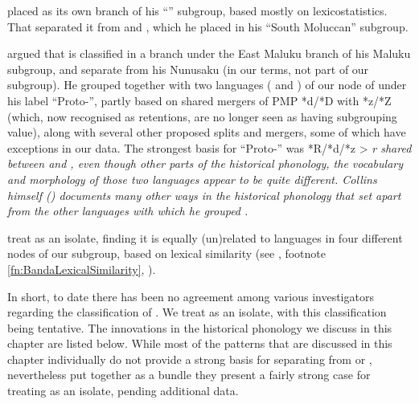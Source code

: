 \citet{Chlenov1976} placed  as its own branch of his “”
subgroup, based mostly on lexicostatistics.
That separated it from 
and , which he placed in his “South Moluccan” subgroup.

\citet{Collins1986} argued that  is classified in a branch
under the East  Maluku branch of his  Maluku subgroup,
and separate from his Nunusaku (in our terms,
not part of our  subgroup).
He grouped  together with two languages (
and ) of our  node of 
under his label “Proto-”,
partly based on shared mergers of PMP *d/*D with *z/*Z (which,
now recognised as retentions,
are no longer seen as having subgrouping value),
along with several other proposed splits
and mergers, some of which have exceptions in our data.
The strongest basis for “Proto-” was *R/*d/*z > \it{r} shared
between  and , even though other parts of the historical phonology,
the vocabulary and morphology of those two languages appear to be quite different.
Collins himself (\citeyear{Collins1986}) documents many other ways in the
historical phonology that set  apart from the other  languages with which he grouped .

\citet[112]{LoskiLoski1989} treat  as an isolate,
finding it is equally (un)related to languages in four different
nodes of our  subgroup,
based on lexical similarity
(see , footnote \ref{fn:BandaLexicalSimilarity},
).

In short, to date there has been no agreement among various investigators
regarding the classification of .
We treat  as an isolate,
with this classification being tentative.
The innovations in the historical phonology we discuss in this
chapter are listed below.
While most of the patterns that are discussed in this chapter
individually do not provide a strong basis for separating 
from  or ,
nevertheless put together as a bundle they present a fairly strong
case for treating  as an isolate, pending additional data.

